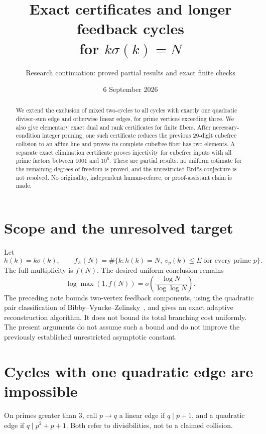 \documentclass[11pt]{article}
\title{Exact certificates and longer feedback cycles\\for \texorpdfstring{$k\sigma(k)=N$}{k sigma(k)=N}}
\author{Research continuation: proved partial results and exact finite checks}
\date{6 September 2026}
\begin{document}
\maketitle
\begin{abstract}
We extend the exclusion of mixed two-cycles to all cycles with exactly one quadratic divisor-sum edge and otherwise linear edges, for prime vertices exceeding three. We also give elementary exact dual and rank certificates for finite fibers. After necessary-condition integer pruning, one such certificate reduces the previous 29-digit cubefree collision to an affine line and proves its complete cubefree fiber has two elements. A separate exact elimination certificate proves injectivity for cubefree inputs with all prime factors between $1001$ and $10^6$. These are partial results: no uniform estimate for the remaining degrees of freedom is proved, and the unrestricted Erd\H{o}s conjecture is not resolved. No originality, independent human-referee, or proof-assistant claim is made.
\end{abstract}

\section{Scope and the unresolved target}
Let
\[
 h(k)=k\sigma(k),\qquad f_E(N)=\#\{k:h(k)=N,\ v_p(k)\le E\text{ for every prime }p\}.
\]
The full multiplicity is $f(N)$. The desired uniform conclusion remains
\[
 \log\max(1,f(N))=o\!\left(\frac{\log N}{\log\log N}\right).
\]
The preceding note bounds two-vertex feedback components, using the quadratic pair classification of Bibby--Vyncke--Zelinsky~\cite{bibby}, and gives an exact adaptive reconstruction algorithm. It does not bound its total branching cost uniformly. The present arguments do not assume such a bound and do not improve the previously established unrestricted asymptotic constant.

\section{Cycles with one quadratic edge are impossible}
On primes greater than $3$, call $p\to q$ a linear edge if $q\mid p+1$, and a quadratic edge if $q\mid p^2+p+1$. Both refer to divisibilities, not to a claimed collision.
\end{document}
